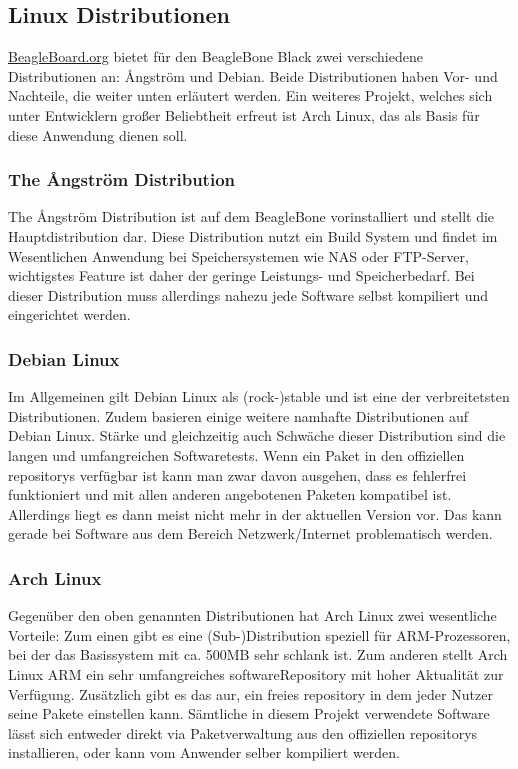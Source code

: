 \subsection{Linux Distributionen}
\href{http://beagleboard.org/}{BeagleBoard.org} bietet für den BeagleBone Black zwei verschiedene Distributionen an: {\AA}ngström und Debian. Beide Distributionen haben Vor- und Nachteile, die weiter unten erläutert werden. Ein weiteres Projekt, welches sich unter Entwicklern großer Beliebtheit erfreut ist Arch Linux, das als Basis für diese Anwendung dienen soll.

\subsubsection{The {\AA}ngström Distribution}
The {\AA}ngström Distribution ist auf dem BeagleBone vorinstalliert und stellt die Hauptdistribution dar. Diese Distribution nutzt ein Build System und findet im Wesentlichen Anwendung bei Speichersystemen wie NAS oder FTP-Server, wichtigstes Feature ist daher der geringe Leistungs- und Speicherbedarf. Bei dieser Distribution muss allerdings nahezu jede Software selbst kompiliert und eingerichtet werden.

\subsubsection{Debian Linux}
Im Allgemeinen gilt Debian Linux als (rock-)stable und ist eine der verbreitetsten Distributionen. Zudem basieren einige weitere namhafte Distributionen auf Debian Linux. Stärke und gleichzeitig auch Schwäche dieser Distribution sind die langen und umfangreichen Softwaretests. Wenn ein Paket in den offiziellen \glspl{repository} verfügbar ist kann man zwar davon ausgehen, dass es fehlerfrei funktioniert und mit allen anderen angebotenen Paketen kompatibel ist. Allerdings liegt es dann meist nicht mehr in der aktuellen Version vor. Das kann gerade bei Software aus dem Bereich Netzwerk/Internet problematisch werden.

\subsubsection{Arch Linux}
Gegenüber den oben genannten Distributionen hat Arch Linux zwei wesentliche Vorteile: Zum einen gibt es eine (Sub-)Distribution speziell für ARM-Prozessoren, bei der das Basissystem mit ca. 500MB sehr schlank ist. Zum anderen stellt Arch Linux ARM ein sehr umfangreiches \gls{softwareRepository} mit hoher Aktualität zur Verfügung. Zusätzlich gibt es das \gls{aur}, ein freies \gls{repository} in dem jeder Nutzer seine Pakete einstellen kann. Sämtliche in diesem Projekt verwendete Software lässt sich entweder direkt via Paketverwaltung aus den offiziellen \glspl{repository} installieren, oder kann vom Anwender selber kompiliert werden.

